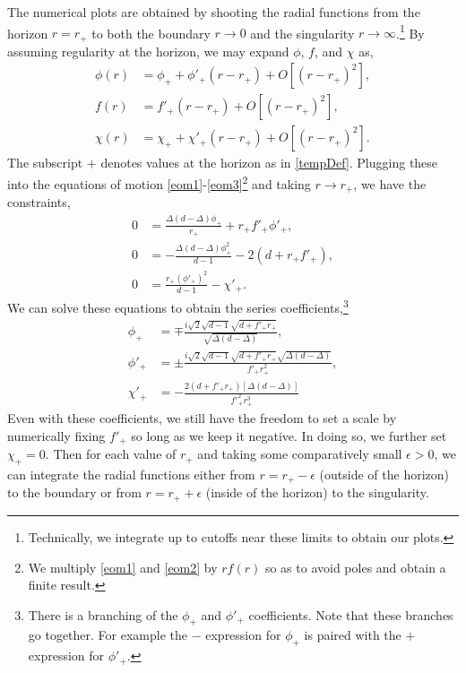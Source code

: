 \documentclass[12pt,a4paper]{article}
\begin{document}
\begin{appendices}
The numerical plots are obtained by shooting the radial functions from the horizon $r = r_+$ to both the boundary $r \to 0$ and the singularity $r \to \infty$.\footnote{Technically, we integrate up to cutoffs near these limits to obtain our plots.} By assuming regularity at the horizon, we may expand $\phi$, $f$, and $\chi$ as,
\begin{align}
\phi(r) &= \phi_+ + \phi'_+ (r-r_+) + O[(r-r_+)^2],\\
f(r) &= f'_+ (r-r_+) + O[(r-r_+)^2],\\
\chi(r) &= \chi_+ + \chi'_+ (r-r_+) + O[(r-r_+)^2].
\end{align}
The subscript $+$ denotes values at the horizon as in \eqref{tempDef}. Plugging these into the equations of motion \eqref{eom1}-\eqref{eom3}\footnote{We multiply \eqref{eom1} and \eqref{eom2} by $rf(r)$ so as to avoid poles and obtain a finite result.} and taking $r \to r_+$, we have the constraints,
\begin{align}
0 &= \frac{\Delta(d-\Delta)\phi_+}{r_+} + r_+ f'_+ \phi'_+,\\
0 &= -\frac{\Delta(d-\Delta)\phi_+^2}{d-1} - 2(d + r_+ f'_+),\\
0 &= \frac{r_+ (\phi'_+)^2}{d-1} - \chi'_+.
\end{align}
We can solve these equations to obtain the series coefficients,\footnote{There is a branching of the $\phi_+$ and $\phi'_+$ coefficients. Note that these branches go together. For example the $-$ expression for $\phi_+$ is paired with the $+$ expression for $\phi'_+$.}
\begin{align}
\phi_+ &= \mp \frac{i\sqrt{2}\sqrt{d-1}\sqrt{d+f'_+ r_+}}{\sqrt{\Delta(d-\Delta)}},\label{rootPhi+}\\
\phi'_+ &= \pm\frac{i\sqrt{2}\sqrt{d-1}\sqrt{d+f'_+ r_+}\sqrt{\Delta(d-\Delta)}}{f'_+ r_+^2},\label{rootPhi1}\\
\chi'_+ &= -\frac{2(d+f'_+ r_+)\left[\Delta(d-\Delta)\right]}{f'^2_+ r_+^3}
\end{align}
Even with these coefficients, we still have the freedom to set a scale by numerically fixing $f'_+$ so long as we keep it negative. In doing so, we further set $\chi_+ = 0$. Then for each value of $r_+$ and taking some comparatively small $\epsilon > 0$, we can integrate the radial functions either from $r = r_+ - \epsilon$ (outside of the horizon) to the boundary or from $r = r_+ + \epsilon$ (inside of the horizon) to the singularity.


\end{appendices}
\end{document}
